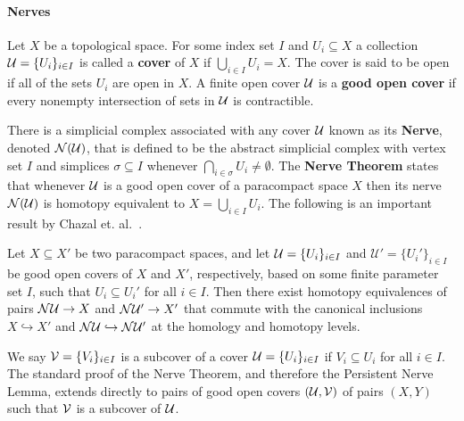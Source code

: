\paragraph{Nerves}


Let $X$ be a topological space.
For some index set $I$ and $U_i\subseteq X$ a collection $\mathcal{U} = \{U_i\}_{i\in I}$ is called a \textbf{cover} of $X$ if $\bigcup_{i\in I} U_i = X$.
The cover is said to be open if all of the sets $U_i$ are open in $X$.
A finite open cover $\mathcal{U}$ is a \textbf{good open cover} if every nonempty intersection of sets in $\mathcal{U}$ is contractible.

There is a simplicial complex associated with any cover $\mathcal{U}$ known as its \textbf{Nerve}, denoted $\mathcal{N}(\mathcal{U})$, that is defined to be the abstract simplicial complex with vertex set $I$ and simplices $\sigma\subseteq I$ whenever $\bigcap_{i\in\sigma} U_i\neq \emptyset$.
The \textbf{Nerve Theorem} states that whenever $\mathcal{U}$ is a good open cover of a paracompact space $X$ then its nerve $\mathcal{N}(\mathcal{U})$ is homotopy equivalent to $X = \bigcup_{i\in I} U_i$.
The following is an important result by Chazal et. al.~\cite{chazal08towards}.

\begin{lemma}\label{lem:pers_nerve}
  Let $X\subseteq X'$ be two paracompact spaces, and let $\mathcal{U} = \{U_i\}_{i\in I}$ and $\mathcal{U}' = \{U_i'\}_{i\in I}$ be good open covers of $X$ and $X'$, respectively, based on some finite parameter set $I$, such that $U_i\subseteq U_i'$ for all $i\in I$.
  Then there exist homotopy equivalences of pairs $\mathcal{N}\mathcal{U}\to X$ and $\mathcal{N}\mathcal{U}'\to X'$ that commute with the canonical inclusions $X \hookrightarrow X'$ and $\mathcal{N}\mathcal{U}\hookrightarrow \mathcal{N}\mathcal{U}'$ at the homology and homotopy levels.
\end{lemma}

We say $\mathcal{V} = \{V_i\}_{i\in I}$ is a subcover of a cover $\mathcal{U} = \{U_i\}_{i\in I}$ if $V_i\subseteq U_i$ for all $i\in I$.
The standard proof of the Nerve Theorem, and therefore the Persistent Nerve Lemma, extends directly to pairs of good open covers $(\mathcal{U}, \mathcal{V})$ of pairs $(X, Y)$ such that $\mathcal{V}$ is a subcover of $\mathcal{U}$.

